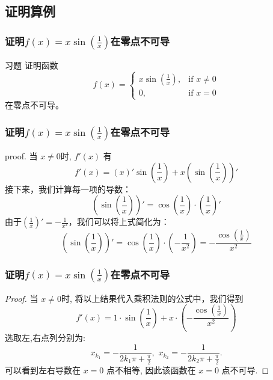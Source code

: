 \documentclass[
10pt,
aspectratio=43,
]{beamer}
\begin{document}
\subsection{证明算例}

\begin{frame}
	\frametitle{证明$f(x)=x\sin\left(\frac{1}{x}\right)$在零点不可导}
	\begin{exampleblock}{习题}
		证明函数
		\[
			f(x) = \begin{cases}
				x\sin\left(\frac{1}{x}\right), & \text{if } x \neq 0 \\
				0,                             & \text{if } x = 0
			\end{cases}
		\]
		在零点不可导。
	\end{exampleblock}
\end{frame}

\begin{frame}
	\frametitle{证明$f(x)=x\sin\left(\frac{1}{x}\right)$在零点不可导}

	\begin{block}{proof.}
		当 $x\neq0$时, $f'(x)$ 有
		\[
			f'(x) = \left(x\right)' \sin\left(\frac{1}{x}\right) + x \left(\sin\left(\frac{1}{x}\right)\right)'
		\]
		接下来，我们计算每一项的导数：
		\[
			\left(\sin\left(\frac{1}{x}\right)\right)' = \cos\left(\frac{1}{x}\right) \cdot \left(\frac{1}{x}\right)'
		\]
		由于$\left(\frac{1}{x}\right)' = -\frac{1}{x^2}$，我们可以将上式简化为：
		\[
			\left(\sin\left(\frac{1}{x}\right)\right)' = \cos\left(\frac{1}{x}\right) \cdot \left(-\frac{1}{x^2}\right) = -\frac{\cos\left(\frac{1}{x}\right)}{x^2}
		\]
	\end{block}
\end{frame}

\begin{frame}
	\frametitle{证明$f(x)=x\sin\left(\frac{1}{x}\right)$在零点不可导}

	\begin{proof}
		当 $x\neq0$时, 将以上结果代入乘积法则的公式中，我们得到
		\[
			f'(x) = 1 \cdot \sin\left(\frac{1}{x}\right) + x \cdot \left(-\frac{\cos\left(\frac{1}{x}\right)}{x^2}\right)
		\]
		选取左,右点列分别为:
		\[
			x_{k_1}=-\displaystyle\frac{1}{2k_1\pi+\frac{\pi}{2}},\,\,x_{k_2}=-\displaystyle\frac{1}{2k_2\pi+\frac{\pi}{2}}.
		\]
		可以看到左右导数在 $x=0$ 点不相等, 因此该函数在 $x=0$ 点不可导.
	\end{proof}
\end{frame}
\end{document}
